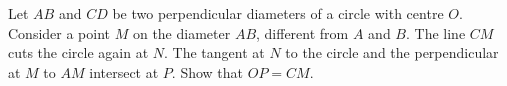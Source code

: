 \documentclass[varwidth]{standalone}
\begin{document}
    Let $AB$ and $CD$ be two perpendicular diameters of a circle with centre $O$. Consider a point $M$ on the diameter $AB$, different from $A$ and $B$. The line $CM$ cuts the circle again at $N$. The tangent at $N$ to the circle and the perpendicular at $M$ to $AM$ intersect at $P$. Show that $OP = CM$.
\end{document}
